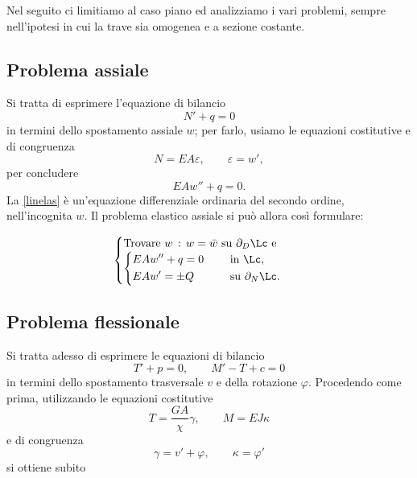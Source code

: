 
Nel seguito ci limitiamo al caso piano ed analizziamo i vari problemi, sempre nell'ipotesi in cui la trave sia omogenea e a sezione costante.

\subsection{Problema assiale}
Si tratta di esprimere l'equazione di bilancio 
\begin{equation}
N'+q=0
\end{equation}
 in termini dello spostamento assiale $w$; per farlo, usiamo le equazioni costitutive e di congruenza
 \begin{equation}
 N=EA\varepsilon, \qquad \varepsilon=w',
 \end{equation}
  per concludere
	\begin{equation}\label{linelas}
EA w''+q=0.
\end{equation}
La \eqref{linelas} è un'equazione differenziale ordinaria del secondo ordine, nell'incognita $w$. Il problema elastico assiale si può allora così formulare:

\begin{definition}
	\begin{equation}
	\begin{cases}
		\mathrm{Trovare~}w\,:\,w=\bar{w}\mathrm{~su~}\partial_D\Lc\mathrm{~e}\\
		\begin{cases}
			\begin{aligned}
				&EA w''+q=0 \quad &&\mathrm{~in~}\Lc,\\
				&EAw'=\pm Q &&\mathrm{~su~}\partial_N\Lc.
			\end{aligned}
		\end{cases}
	\end{cases}
\end{equation}
\end{definition}

\subsection{Problema flessionale}
Si tratta adesso di esprimere le equazioni di bilancio  
\begin{equation}\label{eqbilpe}
T'+p=0, \qquad M'-T+c=0
\end{equation}
 in termini dello spostamento trasversale $v$ e della rotazione $\varphi$. Procedendo come prima, 
 utilizzando le equazioni costitutive
 \begin{equation}
 T=\frac{G A}{\chi} \gamma, \qquad M=EJ\kappa
 \end{equation}
 e di congruenza
 \begin{equation}
 \gamma= v'+\varphi, \qquad \kappa=\varphi'
 \end{equation}
 si ottiene subito

